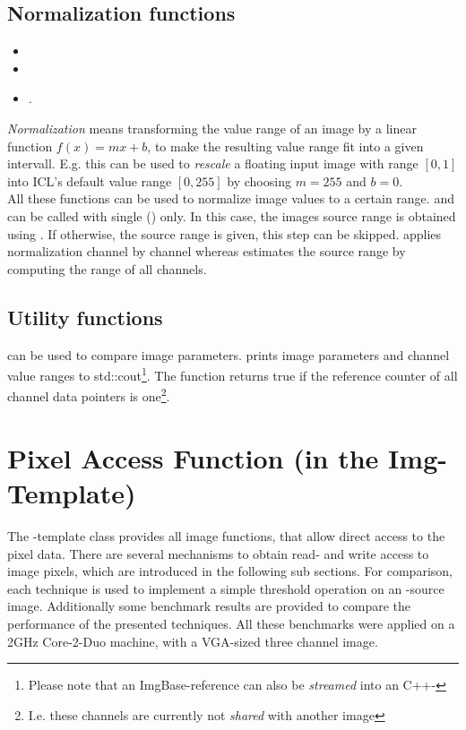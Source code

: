 \subsection{Normalization functions}
\begin{itemize}
\item {}
\item {}
\item {}.
\end{itemize} 
\emph{Normalization} means transforming the value range of an image by a linear function $f(x)=mx+b$, to make the resulting value range fit into a given intervall. E.g. this can be used to \emph{rescale} a floating input image with range $[0,1]$ into ICL's default value range $[0,255]$ by choosing $m=255$ and $b=0$. \\
All these functions can be used to normalize image values to a certain range.  and  can be called with single  () only. In this case, the images source range is obtained using . If otherwise, the source range is given, this step can be skipped.  applies normalization channel by channel whereas  estimates the source range by computing the range of all channels.

\subsection{Utility functions}
 can be used to compare image parameters.  prints image parameters and channel value ranges to std::cout\footnote{Please note that an ImgBase-reference can also be \emph{streamed} into an C++-}. The  function returns true if the reference counter of all channel data pointers is one\footnote{I.e. these channels are currently not \emph{shared} with another image}.

\section{Pixel Access Function (in the Img-Template)}


The -template class provides all image functions, that allow direct access to the pixel data. There are several mechanisms to obtain read- and write access to image pixels, which are introduced in the following sub sections. For comparison, each technique is used to implement a simple threshold operation on an -source image. Additionally some benchmark results are provided to compare the performance of the presented techniques. All these benchmarks were applied on a 2GHz Core-2-Duo machine, with a VGA-sized three channel image.


